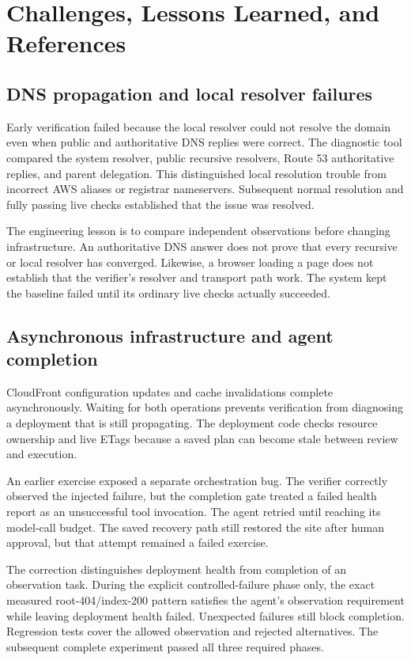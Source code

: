 \documentclass[11pt]{article}
\begin{document}
\section{Challenges, Lessons Learned, and References}
\subsection{DNS propagation and local resolver failures}
Early verification failed because the local resolver could not resolve the domain even when public and authoritative DNS replies were correct. The diagnostic tool compared the system resolver, public recursive resolvers, Route 53 authoritative replies, and parent delegation. This distinguished local resolution trouble from incorrect AWS aliases or registrar nameservers. Subsequent normal resolution and fully passing live checks established that the issue was resolved.

The engineering lesson is to compare independent observations before changing infrastructure. An authoritative DNS answer does not prove that every recursive or local resolver has converged. Likewise, a browser loading a page does not establish that the verifier's resolver and transport path work. The system kept the baseline failed until its ordinary live checks actually succeeded.

\subsection{Asynchronous infrastructure and agent completion}
CloudFront configuration updates and cache invalidations complete asynchronously. Waiting for both operations prevents verification from diagnosing a deployment that is still propagating. The deployment code checks resource ownership and live ETags because a saved plan can become stale between review and execution.

An earlier exercise exposed a separate orchestration bug. The verifier correctly observed the injected failure, but the completion gate treated a failed health report as an unsuccessful tool invocation. The agent retried until reaching its model-call budget. The saved recovery path still restored the site after human approval, but that attempt remained a failed exercise.

The correction distinguishes deployment health from completion of an observation task. During the explicit controlled-failure phase only, the exact measured root-404/index-200 pattern satisfies the agent's observation requirement while leaving deployment health failed. Unexpected failures still block completion. Regression tests cover the allowed observation and rejected alternatives. The subsequent complete experiment passed all three required phases.
\end{document}
